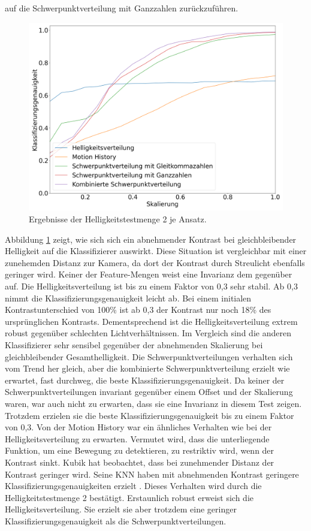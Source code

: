 auf die Schwerpunktverteilung mit Ganzzahlen zurückzuführen.
\begin{figure}[h!]
    \centering
    \includegraphics[width=\linewidth]{images/brightness2_scaling.png}
    \caption{Ergebnisse der Helligkeitstestmenge 2 je Ansatz.}
    \label{fig:brightness2_scaling}
\end{figure}
\newline
\newline
Abbildung \ref{fig:brightness2_scaling} zeigt, wie sich sich ein abnehmender Kontrast bei gleichbleibender Helligkeit auf die Klassifizierer auswirkt. Diese Situation ist vergleichbar mit einer zunehemden Distanz
zur Kamera, da dort der Kontrast durch Streulicht ebenfalls geringer wird. Keiner der Feature-Mengen weist eine Invarianz dem gegenüber auf. Die Helligkeitsverteilung ist bis zu einem Faktor von 0,3 sehr stabil. Ab 0,3
nimmt die Klassifizierungsgenauigkeit leicht ab. Bei einem initialen Kontrastunterschied von 100\% ist ab 0,3 der Kontrast nur noch 18\% des ursprünglichen Kontrasts. Dementsprechend ist die Helligkeitsverteilung extrem
robust gegenüber schlechten Lichtverhältnissen. Im Vergleich sind die anderen Klassifizierer sehr sensibel gegenüber der abnehmenden Skalierung bei gleichbleibender Gesamthelligkeit.
Die Schwerpunktverteilungen verhalten sich vom Trend her gleich, aber die
kombinierte Schwerpunktverteilung erzielt wie erwartet, fast durchweg, die beste Klassifizierungsgenauigkeit. Da keiner der Schwerpunktverteilungen invariant gegenüber einem Offset und der Skalierung waren, war auch
nicht zu erwarten, dass sie eine Invarianz in diesem Test zeigen. Trotzdem erzielen sie die beste Klassifizierungsgenauigkeit bis zu einem Faktor von 0,3. Von der Motion History war ein ähnliches Verhalten wie bei der
Helligkeitsverteilung zu erwarten. Vermutet wird, dass die unterliegende Funktion, um eine Bewegung zu detektieren, zu restriktiv wird, wenn der Kontrast sinkt.
\newline
\newline
Kubik hat beobachtet, dass bei zunehmender Distanz der Kontrast geringer wird. Seine KNN haben mit abnehmenden Kontrast geringere Klassifizierungsgenauigkeiten erzielt \cite{kubikThesis}. Dieses Verhalten wird durch die
Helligkeitstestmenge 2 bestätigt. Erstaunlich robust erweist sich die Helligkeitsverteilung. Sie erzielt sie aber trotzdem eine geringer Klassifizierungsgenauigkeit als die Schwerpunktverteilungen.